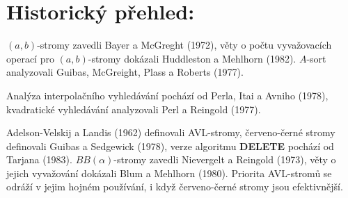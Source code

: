 \documentclass[a4paper,12pt]{article}
\begin{document}
\section{Historický přehled:}

$(a,b)$-stromy zavedli Bayer a McGreght (1972),\newline 
věty o počtu vyvažovacích operací pro $(a,b)$-stromy dokázali 
Huddleston a Mehlhorn (1982).\newline 
$A$-sort analyzovali Guibas, McGreight, Plass a Roberts (1977).

Analýza interpolačního vyhledávání pochází od Perla, 
Itai a Avniho (1978),\newline 
kvadratické vyhledávání analyzovali Perl a Reingold (1977).

Adelson-Velskij a Landis (1962) definovali 
AVL-stromy,\newline 
červeno-černé stromy definovali Guibas a Sedgewick 
(1978),\newline 
verze algoritmu {\bf DELETE} pochází od Tarjana (1983).
$BB(\alpha )$-stromy zavedli Nievergelt a Reingold (1973),\newline 
věty o jejich vyvažování dokázali Blum a Mehlhorn (1980).\newline 
Priorita AVL-stromů se odráží v 
jejim hojném používání, i když červeno-černé stromy 
jsou efektivnější. 
\end{document}
